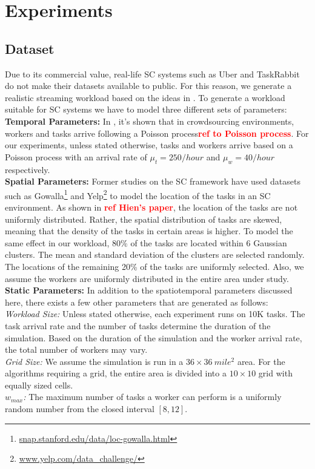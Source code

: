 \section{Experiments}

\subsection{Dataset}
\label{subsec:dataset}
Due to its commercial value, real-life SC systems such as Uber and TaskRabbit do not make their datasets available to public. For this reason, we generate a realistic streaming workload based on the ideas in \cite{Tang07}. To generate a workload suitable for SC systems we have to model three different sets of parameters:\\
\textbf{Temporal Parameters:} In \cite{Basu15}, it's shown that in crowdsourcing environments, workers and tasks arrive following a Poisson process\textcolor{red}{\textbf{ref to Poisson process}}. For our experiments, unless stated otherwise, tasks and workers arrive based on a Poisson process with an arrival rate of $\mu_t = 250/hour$ and $\mu_w = 40/hour$ respectively.\\
\textbf{Spatial Parameters:} Former studies on the SC framework \cite{Kazemi12, Kazemi13, Deng13} have used datasets such as Gowalla\footnote{\url{snap.stanford.edu/data/loc-gowalla.html}} and Yelp\footnote{\url{www.yelp.com/data_challenge/}}  to model the location of the tasks in an SC environment. As shown in \textcolor{red}{\textbf{ref Hien's paper}}, the location of the tasks are not uniformly distributed. Rather, the spatial distribution of tasks are skewed, meaning that the density of the tasks in certain areas is higher. To model the same effect in our workload, 80\% of the tasks are located within 6 Gaussian clusters. The mean and standard deviation of the clusters are selected randomly. The locations of the remaining 20\% of the tasks are uniformly selected. Also, we assume the workers are uniformly distributed in the entire area under study.\\
\textbf{Static Parameters:} In addition to the spatiotemporal parameters discussed here, there exists a few other parameters that are generated as follows:\\
\emph{Workload Size:} Unless stated otherwise, each experiment runs on 10K tasks. The task arrival rate and the number of tasks determine the duration of the simulation. Based on the duration of the simulation and the worker arrival rate, the total number of workers may vary.\\
\emph{Grid Size:} We assume the simulation is run in a $36 \times 36\ mile^2$ area. For the algorithms requiring a grid, the entire area is divided into a $10 \times 10$ grid with equally sized cells.\\
\emph{$w_{max}$:} The maximum number of tasks a worker can perform is a uniformly random number from the closed interval $\left[8,12 \right]$.

